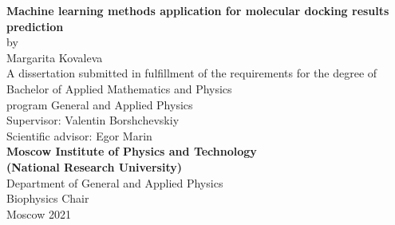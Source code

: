 \begin{center}
\thispagestyle{empty}
\hfill \break
\LARGE{\textbf{Machine learning methods application for molecular docking results prediction}}\\
\Large{by\\
Margarita Kovaleva}\\
\hfill \break
\hfill \break
\hfill \break
\large{A dissertation submitted in fulfillment of the requirements for the degree of Bachelor of Applied Mathematics and Physics\\
\hfill \break
program General and Applied Physics}\\
\hfill \break
\hfill \break
\hfill \break
\Large{Supervisor: Valentin Borshchevskiy}\\
\Large{Scientific advisor: Egor Marin}\\
\hfill \break
\hfill \break
\hfill \break
\large{\textbf{Moscow Institute of Physics and Technology\\ (National Research University)}}\\
\hfill \break
\large{Department of General and Applied Physics\\
Biophysics Chair}\\
\hfill \break
\hfill \break
Moscow 2021 \end{center}
 
\newpage